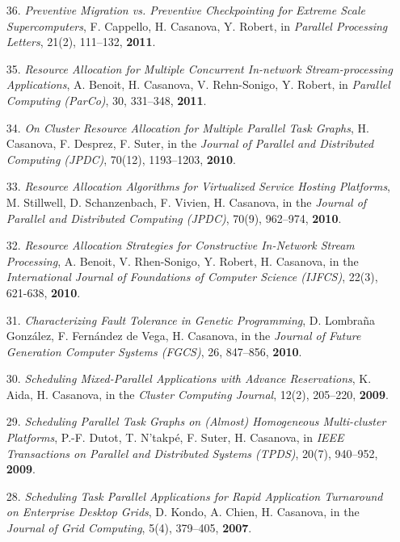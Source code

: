 \begin{enumerate}
\item[36.] {\it Preventive Migration vs. Preventive Checkpointing for Extreme Scale Supercomputers}, F. Cappello, H. Casanova, Y. Robert, in \emph{Parallel Processing Letters}, 21(2), 111--132, {\bf 2011}.

\item[35.] {\it Resource Allocation for Multiple Concurrent In-network Stream-processing Applications}, A. Benoit, H. Casanova, V. Rehn-Sonigo, Y. Robert, in \emph{Parallel Computing (ParCo)}, 30, 331--348, {\bf 2011}.

\item[34.] {\it On Cluster Resource Allocation for Multiple Parallel Task Graphs}, H. Casanova, F. Desprez, F. Suter, in the \emph{Journal of Parallel and Distributed Computing (JPDC)}, 70(12), 1193--1203, {\bf 2010}.

\item[33.] {\it Resource Allocation Algorithms for Virtualized Service Hosting Platforms}, M. Stillwell, D. Schanzenbach, F. Vivien, H. Casanova, in the \emph{Journal of Parallel and Distributed Computing (JPDC)}, 70(9), 962--974, {\bf 2010}.

\item[32.] {\it Resource Allocation Strategies for Constructive In-Network Stream Processing}, A. Benoit, V. Rhen-Sonigo, Y. Robert, H. Casanova, in the \emph{International Journal of Foundations of Computer Science (IJFCS)}, 22(3), 621-638, {\bf 2010}.

\item[31.] {\it Characterizing Fault Tolerance in Genetic Programming}, D. Lombraña González, F. Fernández de Vega, H. Casanova, in the \emph{Journal of Future Generation Computer Systems (FGCS)}, 26, 847--856, {\bf 2010}.

\item[30.] {\it Scheduling Mixed-Parallel Applications with Advance
Reservations}, K. Aida, H. Casanova, in the \emph{Cluster Computing
Journal}, 12(2), 205--220, {\bf 2009}.

\item[29.] {\it Scheduling Parallel Task Graphs on (Almost) Homogeneous
Multi-cluster Platforms}, P.-F. Dutot, T. N'takp\'e, F. Suter, H. Casanova,
in \emph{IEEE Transactions on Parallel and Distributed Systems (TPDS)}, 20(7), 940--952, {\bf 2009}.

\item[28.] {\it Scheduling Task Parallel Applications for Rapid Application Turnaround on Enterprise Desktop Grids}, D. Kondo, A. Chien, H. Casanova,  in the \emph{Journal of Grid Computing}, 5(4), 379--405, {\bf 2007}.


\end{enumerate}

